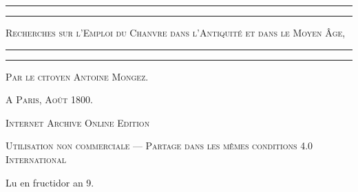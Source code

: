 \documentclass[a4paper, 11pt, oneside, polutonikogreek]{article}
\begin{document}
\begin{titlepage} %
	\centering %

	
	\rule{\textwidth}{1.6pt}\vspace*{-\baselineskip}\vspace*{2pt} %
	\rule{\textwidth}{0.4pt} %
	
	\vspace{1\baselineskip} %
	
	{\scshape\Huge Recherches sur l'Emploi du Chanvre dans l'Antiquité et dans le Moyen Âge,}
	
	\vspace{1\baselineskip} %

	\rule{\textwidth}{0.4pt}\vspace*{-\baselineskip}\vspace{3.2pt} %
	\rule{\textwidth}{1.6pt} %
	
	\vspace{1\baselineskip} %
	

 	\vspace*{1\baselineskip} %

	{\scshape \Large Par le citoyen Antoine Mongez.} %

 	\vspace*{1\baselineskip} %

\vspace*{\fill}

	\vspace{1\baselineskip}

	{\small\scshape A Paris, Août 1800.}
		
	\vspace{0.5\baselineskip} %

\scshape Internet Archive Online Edition%
	
	{\scshape\small Utilisation non commerciale --- Partage dans les mêmes conditions 4.0 International} %
\end{titlepage}
\setlength{\parskip}{1mm plus1mm minus1mm}
\clearpage
\begin{center}
Lu en fructidor an 9.
\end{center}
\end{document}
